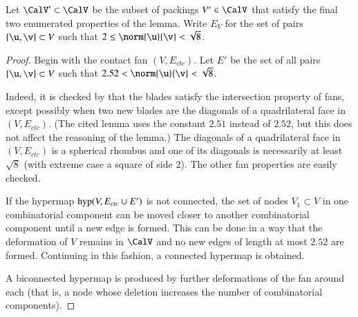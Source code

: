 \documentclass{llncs}
\def\op#1{{\hbox{#1}}}
\begin{document}
\begin{definition}[$\CalV'$,~$E_V$]
%
%
Let $\CalV'\subset\CalV$ be the subset of packings $V'\in\CalV$ that
satisfy the final two enumerated properties of the lemma.  Write
$E_V$ for the set of pairs $\{\u,\v\}\subset V$
  such that $2\le\norm{\u}{\v} <\sqrt8$.
\end{definition}

\begin{proof}
  Begin with the contact fan $(V,E_{ctc})$.  Let $E'$ be the set
  of all pairs $\{\u,\v\}\subset V$ such that
  $2.52<\norm{\u}{\v}<\sqrt8$.

   Indeed, it is checked by
  \cite[Lemma~4.30]{Hales:2006:DCG} that the blades satisfy the
  intersection property of fans, except possibly when two new blades
  are the diagonals of a quadrilateral face in $(V,E_{ctc})$.  (The
  cited lemma uses the constant $2.51$ instead of $2.52$, but this
  does not affect the reasoning of the lemma.)  The diagonals of a quadrilateral face
  in $(V,E_{ctc})$ is a spherical rhombus and one of its diagonals is
  necessarily at least $\sqrt8$ (with extreme case a square of side
  $2$).  The other fan properties are easily checked.

  If the hypermap $\op{hyp}(V,E_{ctc}\cup E')$ is not connected,
  the set of nodes $V_1\subset V$ in one combinatorial component can
  be moved closer to another combinatorial component until a new edge
  is formed.  This can be done in a way that the deformation of $V$
  remains in $\CalV$ and no new edges of length at most $2.52$ are formed.
  Continuing in this fashion, a connected hypermap is obtained.

A biconnected hypermap is produced by  further
 deformations of the fan around each   (that is, a node 
whose deletion increases the number of combinatorial components).
\end{proof}
\end{document}
